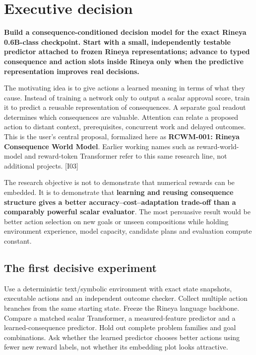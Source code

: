 \documentclass[
  11pt,
  a4paper,
]{article}
\let\RCWMoriginaltoc\tableofcontents
\renewcommand{\tableofcontents}{\RCWMoriginaltoc\tableofcontentsend}
\newcommand{\tableofcontentsend}{\clearpage}
\begin{document}
{
\setcounter{tocdepth}{1}
\tableofcontents
}
\section{Executive decision}\label{executive-decision}

\textbf{Build a consequence-conditioned decision model for the exact
Rineya 0.6B-class checkpoint. Start with a small, independently testable
predictor attached to frozen Rineya representations; advance to typed
consequence and action slots inside Rineya only when the predictive
representation improves real decisions.}

The motivating idea is to give actions a learned meaning in terms of
what they cause. Instead of training a network only to output a scalar
approval score, train it to predict a reusable representation of
consequences. A separate goal readout determines which consequences are
valuable. Attention can relate a proposed action to distant context,
prerequisites, concurrent work and delayed outcomes. This is the user's
central proposal, formalized here as \textbf{RCWM-001: Rineya
Consequence World Model}. Earlier working names such as
reward-world-model and reward-token Transformer refer to this same
research line, not additional projects. {[}I03{]}

The research objective is not to demonstrate that numerical rewards can
be embedded. It is to demonstrate that \textbf{learning and reusing
consequence structure gives a better accuracy--cost--adaptation
trade-off than a comparably powerful scalar evaluator}. The most
persuasive result would be better action selection on new goals or
unseen compositions while holding environment experience, model
capacity, candidate plans and evaluation compute constant.

\subsection{The first decisive
experiment}\label{the-first-decisive-experiment}

Use a deterministic text/symbolic environment with exact state
snapshots, executable actions and an independent outcome checker.
Collect multiple action branches from the same starting state. Freeze
the Rineya language backbone. Compare a matched scalar Transformer, a
measured-feature predictor and a learned-consequence predictor. Hold out
complete problem families and goal combinations. Ask whether the learned
predictor chooses better actions using fewer new reward labels, not
whether its embedding plot looks attractive.
\end{document}
